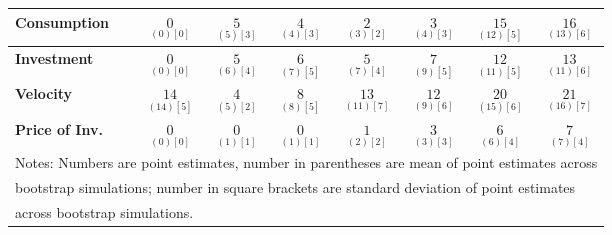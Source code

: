 \documentclass{article}
\begin{document}
\begin{tabular}{|l|c|@{}c|c|@{}c|c|@{}c|c|}
 \textbf{Consumption} & $\underset{(  0) [  0]}{  0}$ & $\underset{(  5) [  3]}{  5}$ & $\underset{(  4) [  3]}{  4}$ & $\underset{(  3) [  2]}{  2}$ & $\underset{(  4) [  3]}{  3}$ & $\underset{( 12) [  5]}{ 15}$ & $\underset{( 13) [  6]}{ 16}$ \\ \hline 
 \textbf{Investment} & $\underset{(  0) [  0]}{  0}$ & $\underset{(  6) [  4]}{  5}$ & $\underset{(  7) [  5]}{  6}$ & $\underset{(  7) [  4]}{  5}$ & $\underset{(  9) [  5]}{  7}$ & $\underset{( 11) [  5]}{ 12}$ & $\underset{( 11) [  6]}{ 13}$ \\ \hline 
 \textbf{Velocity} & $\underset{( 14) [  5]}{ 14}$ & $\underset{(  5) [  2]}{  4}$ & $\underset{(  8) [  5]}{  8}$ & $\underset{( 11) [  7]}{ 13}$ & $\underset{(  9) [  6]}{ 12}$ & $\underset{( 15) [  6]}{ 20}$ & $\underset{( 16) [  7]}{ 21}$ \\ \hline 
 \textbf{Price of Inv.} & $\underset{(  0) [  0]}{  0}$ & $\underset{(  1) [  1]}{  0}$ & $\underset{(  1) [  1]}{  0}$ & $\underset{(  2) [  2]}{  1}$ & $\underset{(  3) [  3]}{  3}$ & $\underset{(  6) [  4]}{  6}$ & $\underset{(  7) [  4]}{  7}$ \\ \hline 
 \multicolumn{8}{|l|}{Notes: Numbers are point estimates, number in 
 parentheses are mean of point estimates across} \\ \hline 
 \multicolumn{8}{|l|}{bootstrap simulations; number in square brackets are 
 standard deviation of point estimates} \\ \hline 
 \multicolumn{8}{|l|}{across bootstrap simulations.} \\ \hline 
 \end{tabular} 
\end{document}
